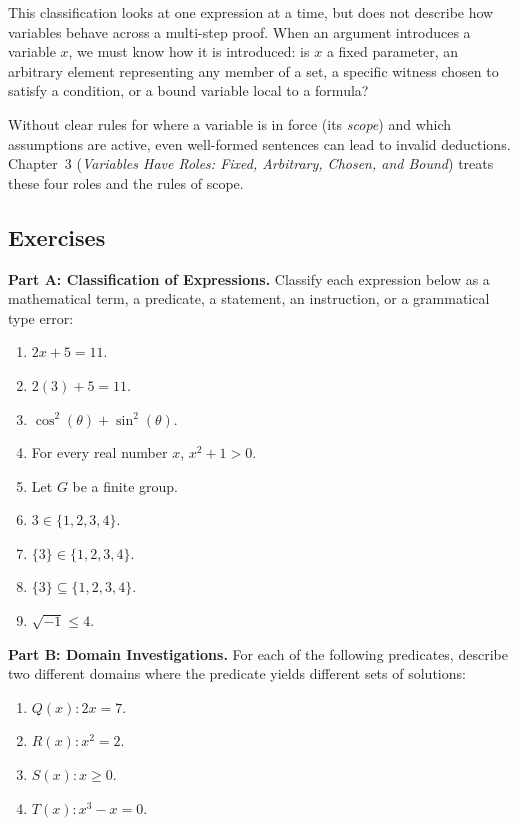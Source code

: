This classification looks at one expression at a time, but does not describe how variables behave across a multi-step proof. When an argument introduces a variable $x$, we must know how it is introduced: is $x$ a fixed parameter, an arbitrary element representing any member of a set, a specific witness chosen to satisfy a condition, or a bound variable local to a formula?

Without clear rules for where a variable is in force (its \emph{scope}) and which assumptions are active, even well-formed sentences can lead to invalid deductions. Chapter~3 (\emph{Variables Have Roles: Fixed, Arbitrary, Chosen, and Bound}) treats these four roles and the rules of scope.

\subsection{Exercises}

\textbf{Part A: Classification of Expressions.} Classify each expression below as a mathematical term, a predicate, a statement, an instruction, or a grammatical type error:
\begin{enumerate}
\item $2x + 5 = 11$.
\item $2(3) + 5 = 11$.
\item $\cos^2(\theta) + \sin^2(\theta)$.
\item For every real number $x$, $x^2 + 1 > 0$.
\item Let $G$ be a finite group.
\item $3 \in \{1, 2, 3, 4\}$.
\item $\{3\} \in \{1, 2, 3, 4\}$.
\item $\{3\} \subseteq \{1, 2, 3, 4\}$.
\item $\sqrt{-1} \le 4$.
\end{enumerate}

\textbf{Part B: Domain Investigations.} For each of the following predicates, describe two different domains where the predicate yields different sets of solutions:
\begin{enumerate}[resume]
\item $Q(x) : 2x = 7$.
\item $R(x) : x^2 = 2$.
\item $S(x) : x \ge 0$.
\item $T(x) : x^3 - x = 0$.
\end{enumerate}


